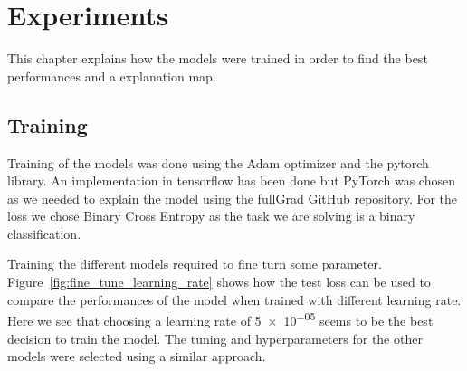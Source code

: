 \chapter{Experiments}
\label{chap:experiments}
This chapter explains how the models were trained in order to find the best performances and a explanation map.
\section{Training}
Training of the models was done using the Adam\cite{kingma2014adam} optimizer and the pytorch\cite{pytorch_paszke2017automatic} library. An implementation in tensorflow\cite{tensorflow_45166} has been done but PyTorch was chosen as we needed to explain the model using the fullGrad\cite{fullgradient} GitHub repository. For the loss we chose Binary Cross Entropy as the task we are solving is a binary classification.

Training the different models required to fine turn some parameter. Figure~\ref{fig:fine_tune_learning_rate} shows how the test loss can be used to compare the performances of the model when trained with different learning rate. Here we see that choosing a learning rate of \num{5e-05} seems to be the best decision to train the model. The tuning and hyperparameters for the other models were selected using a similar approach.  

